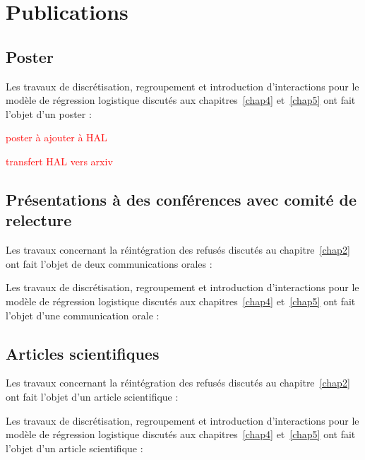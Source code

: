 \chapter{Publications}

\section{Poster}

Les travaux de discrétisation, regroupement et introduction d'interactions pour le modèle de régression logistique discutés aux chapitres~\ref{chap4} et~\ref{chap5} ont fait l'objet d'un poster :


\textcolor{red}{poster à ajouter à HAL}

\textcolor{red}{transfert HAL vers arxiv}


\section{Présentations à des conférences avec comité de relecture}

Les travaux concernant la réintégration des refusés discutés au chapitre~\ref{chap2} ont fait l'objet de deux communications orales :



Les travaux de discrétisation, regroupement et introduction d'interactions pour le modèle de régression logistique discutés aux chapitres~\ref{chap4} et~\ref{chap5} ont fait l'objet d'une communication orale :


\section{Articles scientifiques}

Les travaux concernant la réintégration des refusés discutés au chapitre~\ref{chap2} ont fait l'objet d'un article scientifique :

Les travaux de discrétisation, regroupement et introduction d'interactions pour le modèle de régression logistique discutés aux chapitres~\ref{chap4} et~\ref{chap5} ont fait l'objet d'un article scientifique :

